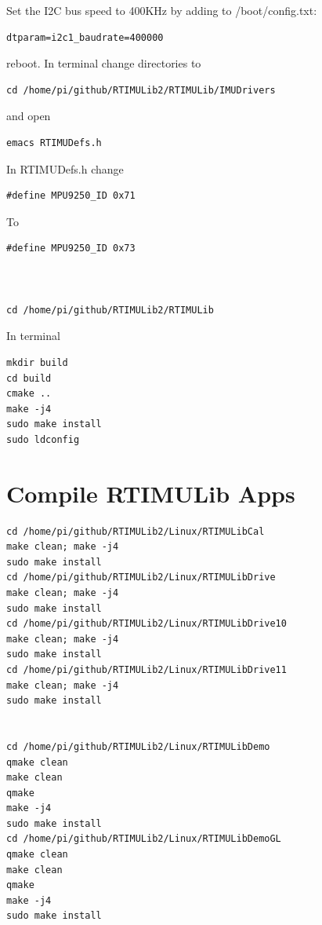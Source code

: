 Set the I2C bus speed to 400KHz by adding to /boot/config.txt:

\begin{verbatim}
dtparam=i2c1_baudrate=400000
\end{verbatim}

reboot. In terminal change directories to

\begin{verbatim}
cd /home/pi/github/RTIMULib2/RTIMULib/IMUDrivers
\end{verbatim}

and open

\begin{verbatim}
emacs RTIMUDefs.h
\end{verbatim}

In RTIMUDefs.h change

\begin{verbatim}
#define MPU9250_ID 0x71
\end{verbatim}

To

\begin{verbatim}
#define MPU9250_ID 0x73



cd /home/pi/github/RTIMULib2/RTIMULib
\end{verbatim}

In terminal

\begin{verbatim}
mkdir build
cd build
cmake ..
make -j4
sudo make install
sudo ldconfig
\end{verbatim}

\section{Compile RTIMULib Apps}\label{compile-rtimulib-apps}

\begin{verbatim}
cd /home/pi/github/RTIMULib2/Linux/RTIMULibCal
make clean; make -j4
sudo make install
cd /home/pi/github/RTIMULib2/Linux/RTIMULibDrive
make clean; make -j4
sudo make install
cd /home/pi/github/RTIMULib2/Linux/RTIMULibDrive10
make clean; make -j4
sudo make install
cd /home/pi/github/RTIMULib2/Linux/RTIMULibDrive11
make clean; make -j4
sudo make install


cd /home/pi/github/RTIMULib2/Linux/RTIMULibDemo    
qmake clean
make clean
qmake
make -j4
sudo make install
cd /home/pi/github/RTIMULib2/Linux/RTIMULibDemoGL
qmake clean
make clean
qmake
make -j4
sudo make install
\end{verbatim}

